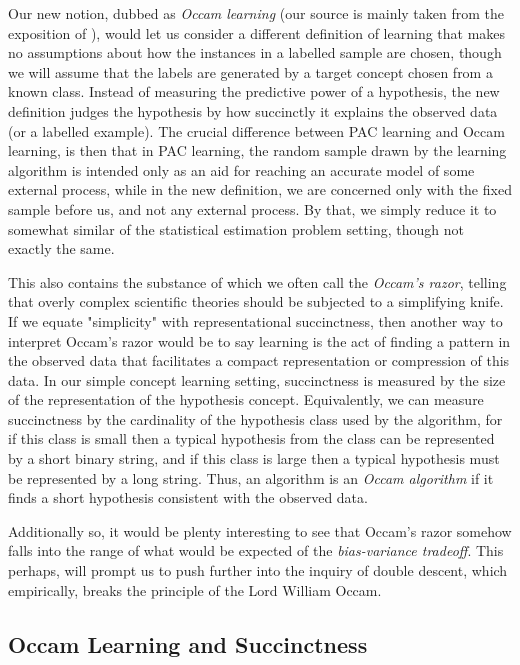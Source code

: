 Our new notion, dubbed as \textit{Occam learning} (our source is mainly taken from the exposition of \cite{10.5555/200548}), would let us consider a different definition of learning that makes no assumptions about how the instances in a labelled sample are chosen, though we will assume that the labels are generated by a target concept chosen from a known class. Instead of measuring the predictive power of a hypothesis, the new definition judges the hypothesis by how succinctly it explains the observed data (or a labelled example). The crucial difference between PAC learning and Occam learning, is then that in PAC learning, the random sample drawn by the learning algorithm is intended only as an aid for reaching an accurate model of some external process, while in the new definition, we are concerned only with the fixed sample before us, and not any external process. By that, we simply reduce it to somewhat similar of the statistical estimation problem setting, though not exactly the same. 

This also contains the substance of which we often call the \textit{Occam's razor}, telling that overly complex scientific theories should be subjected to a simplifying knife. If we equate "simplicity" with representational succinctness, then another way to interpret Occam's razor would be to say learning is the act of finding a pattern in the observed data that facilitates a compact representation or compression of this data. In our simple concept learning setting, succinctness is measured by the size of the representation of the hypothesis concept. Equivalently, we can measure succinctness by the cardinality of the hypothesis class used by the algorithm, for if this class is small then a typical hypothesis from the class can be represented by a short binary string, and if this class is large then a typical hypothesis must be represented by a long string. Thus, an algorithm is an \textit{Occam algorithm} if it finds a short hypothesis consistent with the observed data. 

Additionally so, it would be plenty interesting to see that Occam's razor somehow falls into the range of what would be expected of the \textit{bias-variance tradeoff}. This perhaps, will prompt us to push further into the inquiry of double descent, which empirically, breaks the principle of the Lord William Occam. 

\subsection{Occam Learning and Succinctness}


